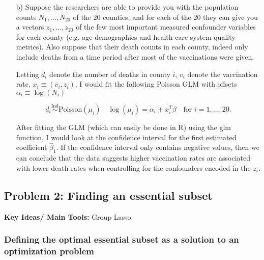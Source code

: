 \begin{enumerate}
\item[b)] Suppose the researchers are able to provide you with the population counts $N_1,\dots,N_{20}$ of the 20 counties, and for each of the $20$ they can give you a vectors $z_1, \dots, z_{20}$ of the few most important measured confounder variables for each county (e.g. age demographics and health care system quality metrics). Also suppose that their death counts in each county, indeed only include deaths from a time period after most of the vaccinations were given.

Letting $d_i$ denote the number of deaths in county $i$, $v_i$ denote the vaccination rate, $x_i \equiv (v_i, z_i)$,  I would fit the following Poisson GLM with offsets $\alpha_i \equiv \log(N_i)$

$$d_i \stackrel{\text{Ind}}{\sim} \text{Poisson} (\mu_i) \quad \log(\mu_i)=\alpha_i + x_i^T \beta \quad \text{for } i=1,...,20.$$

After fitting the GLM (which can easily be done in R) using the glm function, I would look at the confidence interval for the first estimated coefficient $\hat{\beta}_1$. If the confidence interval only contains negative values, then we can conclude that the data suggests higher vaccination rates are associated with lower death rates when controlling for the confounders encoded in the $z_i$. 



\end{enumerate}

\subsection*{Problem 2: Finding an essential subset}

\textbf{Key Ideas/ Main Tools:} Group Lasso

\subsubsection*{Defining the optimal essential subset as a solution to an optimization problem}

